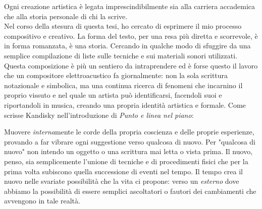 

Ogni creazione artistica è legata imprescindibilmente sia alla carriera accademica che alla storia personale di chi la scrive. \\
Nel corso della stesura di questa tesi, ho cercato di esprimere il mio processo compositivo e creativo. La forma del testo, per una resa più diretta e scorrevole, è in forma romanzata, è una storia. Cercando in qualche modo di sfuggire da una semplice compilazione di liste sulle tecniche e sui materiali sonori utilizzati. \\
Questa composizione è più un sentiero da intraprendere ed è forse questo il lavoro che un compositore elettroacustico fa giornalmente: non la sola scrittura notazionale e simbolica, ma una continua ricerca di fenomeni che incarnino il proprio vissuto e nel quale un artista può identificarsi, facendoli suoi e riportandoli in musica, creando una propria identità artistica e formale. Come scrisse Kandisky nell'introduzione di \textit{Punto e linea nel piano}: 


Muovere \textit{interna}mente le corde della propria coscienza e delle proprie esperienze, provando a far vibrare ogni suggestione verso qualcosa di nuovo. Per "qualcosa di nuovo" non intendo un oggetto o una scrittura mai letta o vista prima. Il nuovo, penso, sia semplicemente l'unione di tecniche e di procedimenti fisici che per la prima volta subiscono quella successione di eventi nel tempo. Il tempo crea il nuovo nelle svariate possibilità che la vita ci propone: verso un \textit{esterno} dove abbiamo la possibilità di essere semplici ascoltatori o fautori dei cambiamenti che avvengono in tale realtà. 
